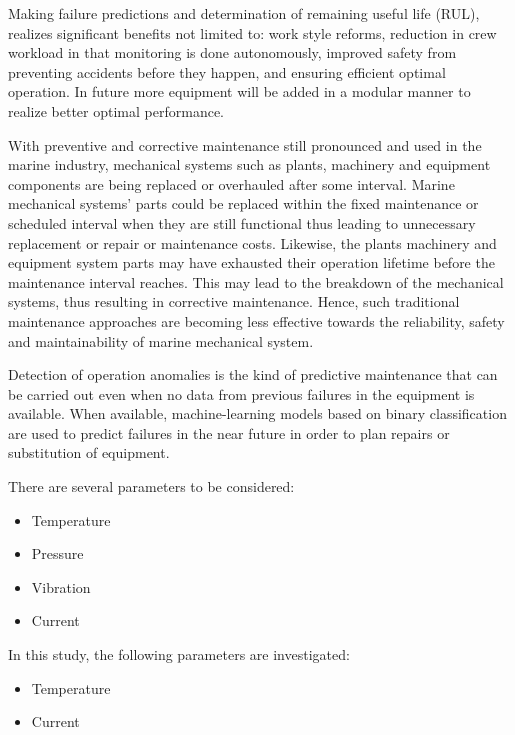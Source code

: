  Making failure predictions and determination of remaining useful life (RUL), realizes significant benefits not limited to: work style reforms, reduction in crew workload in that monitoring is done autonomously, improved safety from preventing accidents before they happen, and ensuring efficient optimal operation. In future more equipment will be added in a modular manner to realize better optimal performance.  

With preventive and corrective maintenance still pronounced and used in the marine industry, mechanical systems such as plants, machinery and equipment components are being replaced or overhauled after some interval. Marine mechanical systems’ parts could be replaced within the fixed maintenance or scheduled interval when they are still functional thus leading to unnecessary replacement or repair or maintenance costs. Likewise, the plants machinery and equipment system parts may have exhausted their operation lifetime before the maintenance interval reaches. This may lead to the breakdown of the mechanical systems, thus resulting in corrective maintenance. Hence, such traditional maintenance approaches are becoming less effective towards the reliability, safety and maintainability of marine mechanical system.

Detection of operation anomalies is the kind of predictive maintenance that can be carried out even when no data from previous failures in the equipment is available. When available, machine-learning models based on binary classification are used to predict failures in the near future in order to plan repairs or substitution of equipment\cite{han_motor_2019}.

There are several parameters to be considered:
\begin{itemize}
	\item Temperature 
	\item Pressure
	\item Vibration
	\item Current
\end{itemize}
In this study, the following parameters are investigated:
\begin{itemize}
	\item Temperature
	\item Current
\end{itemize}
	
	


